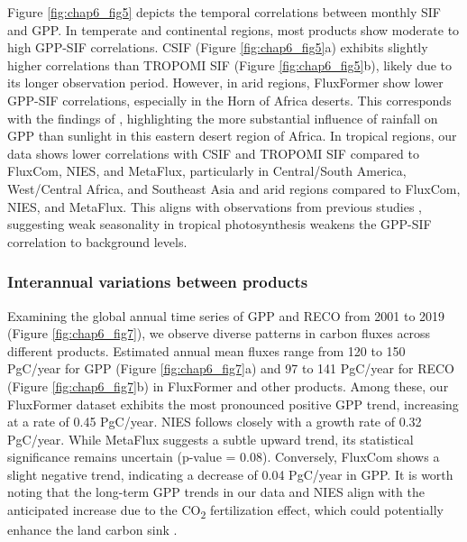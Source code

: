 Figure \ref{fig:chap6_fig5} depicts the temporal correlations between monthly SIF and GPP. In temperate and continental regions, most products show moderate to high GPP-SIF correlations. CSIF (Figure \ref{fig:chap6_fig5}a) exhibits slightly higher correlations than TROPOMI SIF (Figure \ref{fig:chap6_fig5}b), likely due to its longer observation period. However, in arid regions, FluxFormer show lower GPP-SIF correlations, especially in the Horn of Africa deserts. This corresponds with the findings of \citep{palmer2023drivers}, highlighting the more substantial influence of rainfall on GPP than sunlight in this eastern desert region of Africa. In tropical regions, our data shows lower correlations with CSIF and TROPOMI SIF compared to FluxCom, NIES, and MetaFlux, particularly in Central/South America, West/Central Africa, and Southeast Asia and arid regions compared to FluxCom, NIES, and MetaFlux. This aligns with observations from previous studies \citep{sanders2016spaceborne,doughty2021global,shekhar2022113282}, suggesting weak seasonality in tropical photosynthesis weakens the GPP-SIF correlation to background levels.


\subsubsection{Interannual variations between products}

Examining the global annual time series of GPP and RECO from 2001 to 2019 (Figure \ref{fig:chap6_fig7}), we observe diverse patterns in carbon fluxes across different products. Estimated annual mean fluxes range from 120 to 150 PgC/year for GPP (Figure \ref{fig:chap6_fig7}a) and 97 to 141 PgC/year for RECO (Figure \ref{fig:chap6_fig7}b) in FluxFormer and other products. Among these, our FluxFormer dataset exhibits the most pronounced positive GPP trend, increasing at a rate of 0.45 PgC/year. NIES follows closely with a growth rate of 0.32 PgC/year. While MetaFlux suggests a subtle upward trend, its statistical significance remains uncertain (p-value = 0.08). Conversely, FluxCom shows a slight negative trend, indicating a decrease of 0.04 PgC/year in GPP. It is worth noting that the long-term GPP trends in our data and NIES align with the anticipated increase due to the CO\textsubscript{2} fertilization effect, which could potentially enhance the land carbon sink \citep{piao2020characteristics, yang2022divergent, guo2023estimating}. \par

